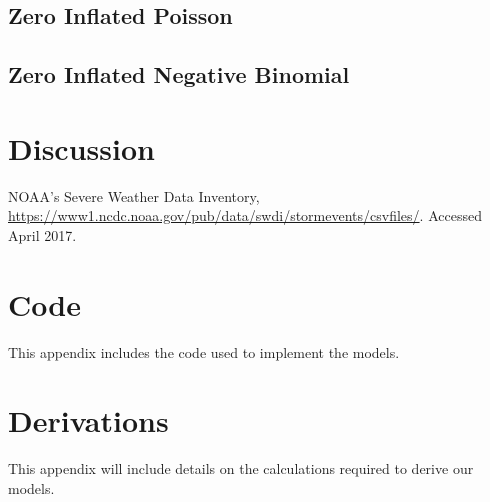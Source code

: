 \documentclass{article}
\begin{document}
\subsection{Zero Inflated Poisson}
\label{ss:rZiPoisson}

\subsection{Zero Inflated Negative Binomial}
\label{ss:rZiNBinom}

\section{Discussion}
\label{s:discussion}

\begin{thebibliography}{1}
   NOAA's Severe Weather Data Inventory, 
    \url{https://www1.ncdc.noaa.gov/pub/data/swdi/stormevents/csvfiles/}. 
    Accessed April 2017.
\end{thebibliography}
\clearpage
\appendix
\section{Code}
\label{a:code}
This appendix includes the code used to implement the models.

\section{Derivations}
\label{a:derivation}
This appendix will include details on the calculations required to derive our models.
\end{document}
